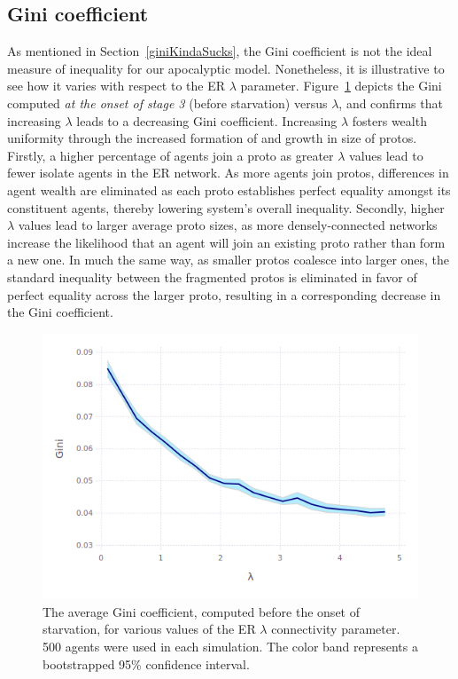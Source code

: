 \subsection{Gini coefficient}

As mentioned in Section~\ref{giniKindaSucks}, the Gini coefficient is not the ideal measure of inequality for our apocalyptic model. Nonetheless, it is illustrative to see how it varies with respect to the ER $\lambda$ parameter. Figure~\ref{fig:giniVsLambda} depicts the Gini computed \textit{at the onset of stage 3} (before starvation) versus $\lambda$, and confirms that increasing $\lambda$ leads to a decreasing Gini coefficient. Increasing $\lambda$ fosters wealth uniformity through the increased formation of and growth in size of protos. Firstly, a higher percentage of agents join a proto as greater $\lambda$ values lead to fewer isolate agents in the ER network. As more agents join protos, differences in agent wealth are eliminated as each proto establishes perfect equality amongst its constituent agents, thereby lowering system's overall inequality. Secondly, higher $\lambda$ values lead to larger average proto sizes, as more densely-connected networks increase the likelihood that an agent will join an existing proto rather than form a new one. In much the same way, as smaller protos coalesce into larger ones, the standard inequality between the fragmented protos is eliminated in favor of perfect equality across the larger proto, resulting in a corresponding decrease in the Gini coefficient. 

\begin{figure}[hb]
\centering
\includegraphics[width=\columnwidth]{figures/giniVsLambda.png}
\caption{The average Gini coefficient, computed before the onset of starvation,
for various values of the ER $\lambda$ connectivity parameter. 500 agents were
used in each simulation. The color band represents a bootstrapped 95\% confidence
interval.}
\label{fig:giniVsLambda}
\end{figure}


